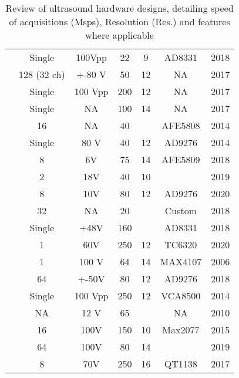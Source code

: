 \begin{table}[H]
\begin{tabular}{l|c|c|c|c|c|c}
 \cite{jonveaux_arduino-like_2017} & Single      & 100Vpp  & 22   & 9    & AD8331  & 2018 \\
 \cite{kim_smart-phone_2017}       & 128 (32 ch) & +-80 V  & 50   & 12   & NA      & 2017 \\
\cite{kruizinga_compressive_2017}  & Single      & 100 Vpp & 200  & 12   & NA      & 2017 \\
\cite{kushi_ultrasonic_2017}     & Single      & NA      & 100  & 14   & NA      & 2017 \\
\cite{lee_new_2014}             & 16          & NA      & 40   &      & AFE5808 & 2014 \\
\cite{li_new_2014}         & Single      & 80 V    & 40   & 12   & AD9276  & 2014 \\
\cite{matera_smart_2018}       & 8           & 6V      & 75   & 14   & AFE5809 & 2018 \\
\cite{nguyen_estimating_2019}    & 2           & 18V     & 40   & 10   &         & 2019 \\
\cite{pashaei_flexible_2020}      & 8           & 10V     & 80   & 12   & AD9276  & 2020 \\
 \cite{peyton_comparison_2018}     & 32          & NA      & 20   &      & Custom  & 2018 \\
\cite{qiu_delayed-excitation_2018} & Single      & +48V    & 160  &      & AD8331  & 2018 \\
\cite{qiu_ultrasound_2020}         & 1           & 60V     & 250  & 12   & TC6320  & 2020 \\
\cite{ricci_programmable_2006}   & 1           & 100 V   & 64   & 14   & MAX4107 & 2006 \\
\cite{roman_open-source_2018}   & 64          & +-50V   & 80   & 12   & AD9276  & 2018 \\
 \cite{vasudevan_programmable_2014} & Single      & 100 Vpp & 250  & 12   & VCA8500 & 2014 \\
\cite{wall_high-speed_2010}        & NA          & 12 V    & 65   &      & NA      & 2010 \\
\cite{weng_fpga-based_2015}      & 16          & 100V    & 150  & 10   & Max2077 & 2015 \\
\cite{zhang_high_2019}            & 64          & 100V    & 80   & 14   &         & 2019 \\
\cite{zhang_multi-channel_2017}     & 8           & 70V     & 250  & 16   & QT1138  & 2017   \\ 
\hline
\end{tabular} 
\caption{Review of ultrasound hardware designs, detailing speed of acquisitions (Msps), Resolution (Res.) and features where applicable}
\label{tab:benchmarklite}
\end{table}
